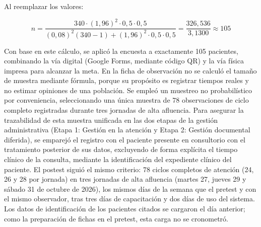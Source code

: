 Al reemplazar los valores:

\begin{equation}
n = \frac{340 \cdot (1{,}96)^{2} \cdot 0{,}5 \cdot 0{,}5}{(0{,}08)^{2}(340 - 1) + (1{,}96)^{2} \cdot 0{,}5 \cdot 0{,}5} = \frac{326{,}536}{3{,}1300} \approx 105
\end{equation}

Con base en este cálculo, se aplicó la encuesta a exactamente 105 pacientes, combinando la vía digital (Google Forms, mediante código QR) y la vía física impresa para alcanzar la meta.
En la ficha de observación no se calculó el tamaño de muestra mediante fórmula, porque su propósito es registrar tiempos reales y no estimar opiniones de una población. Se empleó un muestreo no probabilístico por conveniencia, seleccionando una única muestra de 78 observaciones de ciclo completo registradas durante tres jornadas de alta afluencia. Para asegurar la trazabilidad de esta muestra unificada en las dos etapas de la gestión administrativa (Etapa 1: Gestión en la atención y Etapa 2: Gestión documental diferida), se emparejó el registro con el paciente presente en consultorio con el tratamiento posterior de sus datos, excluyendo de forma explícita el tiempo clínico de la consulta, mediante la identificación del expediente clínico del paciente. El postest siguió el mismo criterio: 78 ciclos completos de atención (24, 26 y 28 por jornada) en tres jornadas de alta afluencia (martes 27, jueves 29 y sábado 31 de octubre de 2026), los mismos días de la semana que el pretest y con el mismo observador, tras tres días de capacitación y dos días de uso del sistema. Los datos de identificación de los pacientes citados se cargaron el día anterior; como la preparación de fichas en el pretest, esta carga no se cronometró.

